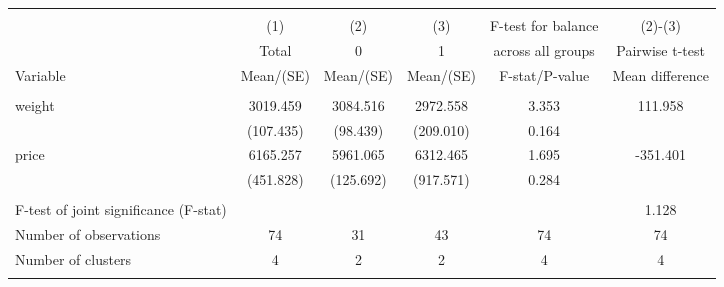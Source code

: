 
\begin{tabular}{@{\extracolsep{5pt}}lccccc}
\\[-1.8ex]\hline \hline \\[-1.8ex]
 & \multicolumn{1}{c}{(1)}  & \multicolumn{1}{c}{(2)}  & \multicolumn{1}{c}{(3)}  & \multicolumn{1}{c}{F-test for balance} & \multicolumn{1}{c}{(2)-(3)} \\
 & \multicolumn{1}{c}{Total}  & \multicolumn{1}{c}{0}  & \multicolumn{1}{c}{1}  & \multicolumn{1}{c}{across all groups} & \multicolumn{1}{c}{Pairwise t-test}  \\
Variable & Mean/(SE) & Mean/(SE) & Mean/(SE) & F-stat/P-value & Mean difference \\ \hline \\[-1.8ex] 
weight   & 3019.459    & 3084.516    & 2972.558    & 3.353    & 111.958   \\
 & (107.435)  & (98.439)  & (209.010)  & 0.164  &   \\
price   & 6165.257    & 5961.065    & 6312.465    & 1.695    & -351.401   \\
 & (451.828)  & (125.692)  & (917.571)  & 0.284  &   \\
\hline \\[-1.8ex]
F-test of joint significance (F-stat) &   &   &   &     &  1.128   \\
Number of observations  & 74   & 31   & 43  & 74 & 74   \\
Number of clusters & 4  & 2  & 2  & 4 & 4   \\
\hline \\[-1.8ex]

\end{tabular}
